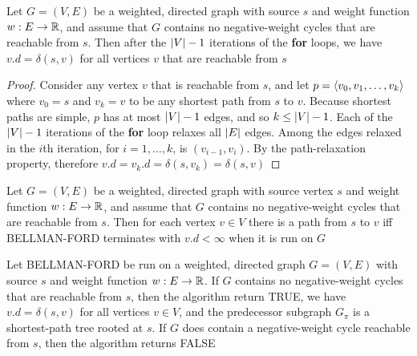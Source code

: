 \documentclass[11pt]{article}
\begin{document}
\begin{lemma}[]
Let \(G=(V,E)\) be a weighted, directed graph with source \(s\) and weight function \(w:E\to\mathbb{R}\),
and assume that \(G\) contains no negative-weight cycles that are reachable from \(s\). Then
after the \(\abs{V}-1\) iterations of the \textbf{for} loops, we have \(v.d=\delta(s,v)\) for all
vertices \(v\) that are reachable from \(s\)
\end{lemma}

\begin{proof}
Consider any vertex \(v\) that is reachable from \(s\), and let \(p=\langle v_0,v_1,\dots,v_k\rangle\)
where \(v_0=s\) and \(v_k=v\) to be any shortest path from \(s\) to \(v\). Because shortest
paths are simple, \(p\) has at most \(\abs{V}-1\) edges, and so \(k\le\abs{V}-1\). Each of
the \(\abs{V}-1\) iterations of the \textbf{for} loop relaxes all \(\abs{E}\) edges. Among the edges
relaxed in the \(i\)th iteration, for \(i=1,\dots,k\), is \((v_{i-1},v_i)\). By the path-relaxation
property, therefore \(v.d=v_k.d=\delta(s,v_k)=\delta(s,v)\)
\end{proof}

\begin{corollary}[]
Let \(G=(V,E)\) be a weighted, directed graph with source vertex \(s\) and weight
function \(w:E\to\mathbb{R}\), and assume that \(G\) contains no negative-weight cycles that are reachable
from \(s\). Then for each vertex \(v\in V\) there is a path from \(s\) to \(v\) iff BELLMAN-FORD
terminates with \(v.d<\infty\) when it is run on \(G\)
\end{corollary}

\begin{theorem}
Let BELLMAN-FORD be run on a weighted, directed graph \(G=(V,E)\) with source \(s\) and weight
function \(w:E\to\mathbb{R}\). If \(G\) contains no negative-weight cycles that are reachable from \(s\),
then the algorithm return TRUE, we have \(v.d=\delta(s,v)\) for all vertices \(v\in V\), and the
predecessor subgraph \(G_\pi\) is a shortest-path tree rooted at \(s\). If \(G\) does contain a
negative-weight cycle reachable from \(s\), then the algorithm returns FALSE
\end{theorem}
\end{document}
